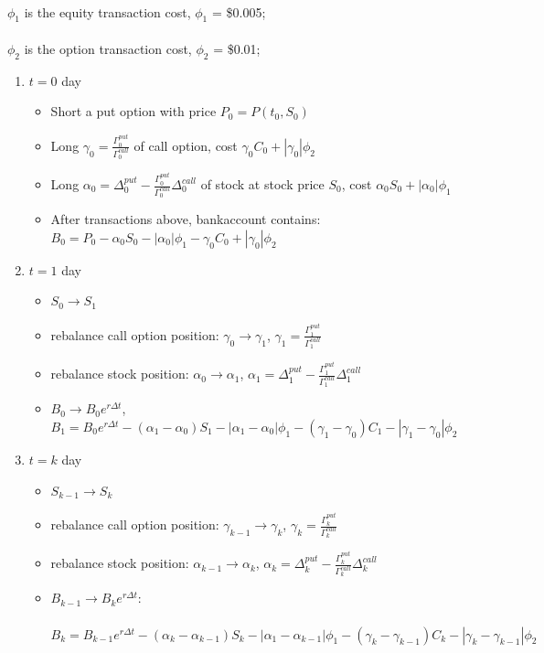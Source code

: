 \documentclass[12pt]{article}
\begin{document}
\\ $\phi_1$ is the equity transaction cost, $\phi_1$ = \$0.005;\\
\\ $\phi_2$ is the option transaction cost, $\phi_2$ = \$0.01;\\
\begin{enumerate}
  \item $t=0$ day
  \begin{itemize}
    \item Short a put option with price $P_0=P(t_0, S_0)$
    \item Long $\gamma_0 = \frac{\Gamma^{put}_0}{\Gamma^{call}_0}$ of call option, cost $\gamma_0C_0 + |\gamma_0|\phi_2$
    \item Long $\alpha_0 = \Delta^{put}_0-\frac{\Gamma^{put}_0}{\Gamma^{call}_0}\Delta^{call}_0$ of stock at stock price $S_0$, cost $\alpha_0S_0 + |\alpha_0|\phi_1$
    \item After transactions above, bankaccount contains:\\
       $B_0=P_0-\alpha_0S_0 - |\alpha_0|\phi_1 - \gamma_0C_0 + |\gamma_0|\phi_2$
  \end{itemize}

  \item $t=1$ day
  \begin{itemize}
    \item $S_0 \rightarrow S_1$
    \item rebalance call option position: $\gamma_0 \rightarrow \gamma_1$, $\gamma_1 = \frac{\Gamma^{put}_1}{\Gamma^{call}_1}$
    \item rebalance stock position: $\alpha_0 \rightarrow \alpha_1$, $\alpha_1 = \Delta^{put}_1-\frac{\Gamma^{put}_1}{\Gamma^{call}_1}\Delta^{call}_1$
    \item $B_0 \rightarrow B_0e^{r\Delta t}$, $B_1 = B_0e^{r\Delta t} - (\alpha_1-\alpha_0)S_1 - |\alpha_1-\alpha_0|\phi_1 - (\gamma_1-\gamma_0)C_1 - |\gamma_1-\gamma_0| \phi_2$
  \end{itemize}
  
  \item $t=k$ day
  \begin{itemize}
    \item $S_{k-1} \rightarrow S_k$
    \item rebalance call option position: $\gamma_{k-1} \rightarrow \gamma_k$, $\gamma_k = \frac{\Gamma^{put}_k}{\Gamma^{call}_k}$
    \item rebalance stock position: $\alpha_{k-1} \rightarrow \alpha_k$, $\alpha_k = \Delta^{put}_k-\frac{\Gamma^{put}_k}{\Gamma^{call}_k}\Delta^{call}_k$
    \item $B_{k-1} \rightarrow B_ke^{r\Delta t}$:\\\\
     $B_k = B_{k-1}e^{r\Delta t} - (\alpha_k-\alpha_{k-1})S_k - |\alpha_1-\alpha_{k-1}|\phi_1 - (\gamma_k-\gamma_{k-1})C_k - |\gamma_k-\gamma_{k-1}| \phi_2$
  \end{itemize}


\end{enumerate}
\end{document}
